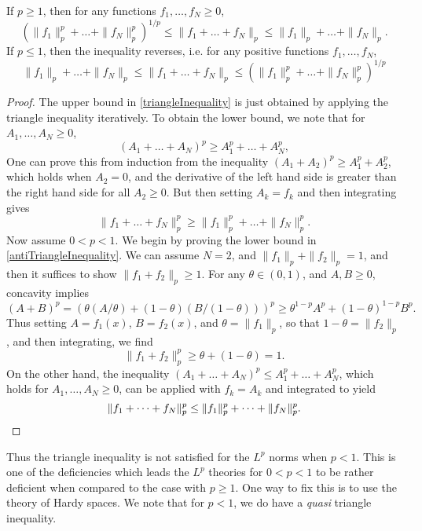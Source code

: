 \begin{theorem}
    If $p \geq 1$, then for any functions $f_1, \dots, f_N \geq 0$,
    \begin{equation} \label{triangleInequality} ( \| f_1 \|_p^p + \dots + \| f_N \|_p^p )^{1/p} \leq \| f_1 + \dots + f_N \|_p \leq \| f_1 \|_p + \dots + \| f_N \|_p. \end{equation}
    If $p \leq 1$, then the inequality reverses, i.e. for any positive functions $f_1, \dots, f_N$,
    \begin{equation} \label{antiTriangleInequality} \| f_1 \|_p + \dots + \| f_N \|_p \leq \| f_1 + \dots + f_N \|_p \leq (\| f_1 \|_p^p + \dots + \| f_N \|_p^p)^{1/p} \end{equation}
\end{theorem}
\begin{proof}
    The upper bound in \eqref{triangleInequality} is just obtained by applying the triangle inequality iteratively. To obtain the lower bound, we note that for $A_1, \dots, A_N \geq 0$,
    \[ (A_1 + \dots + A_N)^p \geq A_1^p + \dots + A_N^p, \]
    One can prove this from induction from the inequality $(A_1 + A_2)^p \geq A_1^p + A_2^p$, which holds when $A_2 = 0$, and the derivative of the left hand side is greater than the right hand side for all $A_2 \geq 0$. But then setting $A_k = f_k$ and then integrating gives
    \[ \| f_1 + \dots + f_N \|_p^p \geq \| f_1 \|_p^p + \dots + \| f_N \|_p^p. \]
    Now assume $0 < p < 1$. We begin by proving the lower bound in \ref{antiTriangleInequality}. We can assume $N = 2$, and $\| f_1 \|_p + \| f_2 \|_p = 1$, and then it suffices to show $\| f_1 + f_2 \|_p \geq 1$. For any $\theta \in (0,1)$, and $A,B \geq 0$, concavity implies
    \[ (A + B)^p = (\theta (A/\theta) + (1 - \theta) (B/(1-\theta)))^p \geq \theta^{1-p} A^p + (1 - \theta)^{1-p} B^p. \]
    Thus setting $A = f_1(x)$, $B = f_2(x)$, and $\theta = \| f_1 \|_p$, so that $1 - \theta = \| f_2 \|_p$, and then integrating, we find
    \[ \| f_1 + f_2 \|_p^p \geq \theta + (1 - \theta) = 1. \]
    On the other hand, the inequality $(A_1 + \dots + A_N)^p \leq A_1^p + \dots + A_N^p$, which holds for $A_1, \dots, A_N \geq 0$, can be applied with $f_k = A_k$ and integrated to yield
    \[ \| f_1 + \dots + f_N \|_p^p \leq \| f_1 \|_p^p + \dots + \| f_N \|_p^p. \qedhere \]
\end{proof}

Thus the triangle inequality is not satisfied for the $L^p$ norms when $p < 1$. This is one of the deficiencies which leads the $L^p$ theories for $0 < p < 1$ to be rather deficient when compared to the case with $p \geq 1$. One way to fix this is to use the theory of Hardy spaces. We note that for $p < 1$, we do have a \emph{quasi} triangle inequality.

